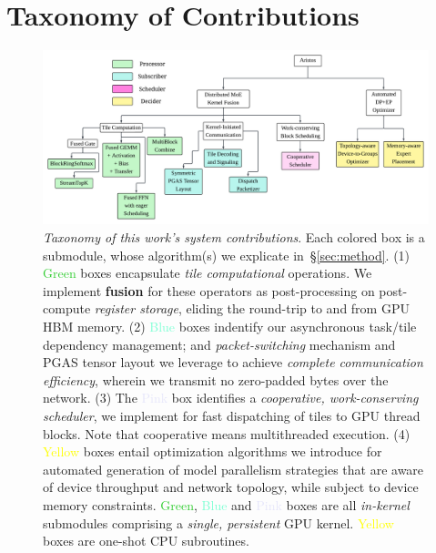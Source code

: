 \section{Taxonomy of Contributions}\label{sec:taxonomy-of-contributions}
\begin{figure}[!ht]
    \centering
    \includegraphics[width=5.5in,keepaspectratio]{figures/Taxonomy}
    \caption{\emph{Taxonomy of this work's system contributions}.
    Each colored box is a submodule, whose algorithm(s) we explicate in~\S\ref{sec:method}.
        (1) \textcolor{LimeGreen}{Green} boxes encapsulate \emph{tile computational} operations.
        We implement \textbf{fusion} for these operators as post-processing on post-compute \emph{register storage},
        eliding the round-trip to and from GPU HBM memory. (2) \textcolor{Aquamarine}{Blue} boxes indentify
        our asynchronous task/tile dependency management; and \emph{packet-switching} mechanism and
        PGAS tensor layout we leverage to achieve
        \emph{complete communication efficiency}, wherein we transmit no zero-padded bytes over the network.
        (3) The \textcolor{Lavender}{Pink} box identifies a \emph{cooperative, work-conserving scheduler},
        we implement for fast dispatching of tiles to GPU thread blocks. Note that cooperative means
        multithreaded execution.
        (4) \textcolor{yellow}{Yellow} boxes entail optimization algorithms
        we introduce for automated generation of model parallelism strategies that are
        aware of device throughput and network topology, while subject to device memory constraints.
        \textcolor{LimeGreen}{Green}, \textcolor{Aquamarine}{Blue} and \textcolor{Lavender}{Pink} boxes are
        all \emph{in-kernel} submodules comprising a \emph{single, persistent} GPU kernel.
        \textcolor{yellow}{Yellow} boxes are one-shot CPU subroutines.
    }
    \label{fig:taxonomy}
\end{figure}